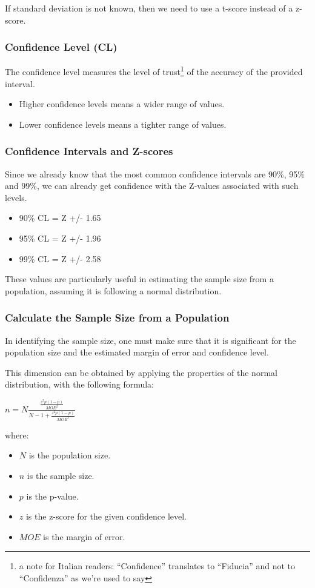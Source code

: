 \documentclass{article}
\begin{document}
If standard deviation is not known, then we need to use a t-score instead of a z-score.

\subsubsection{Confidence Level (CL)}
The confidence level measures the level of trust\footnote{a note for Italian readers: “Confidence” translates to “Fiducia” and not to “Confidenza” as we’re used to say} of the accuracy of the provided interval. 

\begin{itemize}
    \item Higher confidence levels means a wider range of values.
    \item Lower confidence levels means a tighter range of values.
\end{itemize}

\subsubsection{Confidence Intervals and Z-scores}
Since we already know that the most common confidence intervals are 90\%, 95\% and 99\%, we can already get confidence with the Z-values associated with such levels.
\begin{itemize}
    \item 90\% CL = Z +/- 1.65
    \item 95\% CL = Z +/- 1.96
    \item 99\% CL = Z +/- 2.58
\end{itemize}

These values are particularly useful in estimating the sample size from a population, assuming it is following a normal distribution. 

\subsubsection{Calculate the Sample Size from a Population}
In identifying the sample size, one must make sure that it is significant for the population size and the estimated margin of error and confidence level.

This dimension can be obtained by applying the properties of the normal distribution, with the following formula:

$\displaystyle {n = N \frac{\frac{z^2p(1 - p)}{MOE^2}}{N - 1 + \frac{z^2p(1 - p)}{MOE^2}}}$

where:
\begin{itemize}
    \item $N$ is the population size.
    \item $n$ is the sample size.
    \item $p$ is the p-value.
    \item $z$ is the z-score for the given confidence level.
    \item $MOE$ is the margin of error.
\end{itemize}
\end{document}

